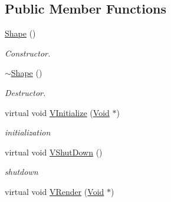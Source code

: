 \subsection*{Public Member Functions}
\begin{DoxyCompactItemize}
\item 
\hypertarget{classContent_1_1Shape_1_1Renderer_1_1Shape_a12e9b7f1287c655fbe5b909c3b0bb60c}{
\hyperlink{classContent_1_1Shape_1_1Renderer_1_1Shape_a12e9b7f1287c655fbe5b909c3b0bb60c}{Shape} ()}
\label{classContent_1_1Shape_1_1Renderer_1_1Shape_a12e9b7f1287c655fbe5b909c3b0bb60c}

\begin{DoxyCompactList}\small\item\em Constructor. \item\end{DoxyCompactList}\item 
\hypertarget{classContent_1_1Shape_1_1Renderer_1_1Shape_abb84c4d7b779c13898c680c7394a36d0}{
\hyperlink{classContent_1_1Shape_1_1Renderer_1_1Shape_abb84c4d7b779c13898c680c7394a36d0}{$\sim$Shape} ()}
\label{classContent_1_1Shape_1_1Renderer_1_1Shape_abb84c4d7b779c13898c680c7394a36d0}

\begin{DoxyCompactList}\small\item\em Destructor. \item\end{DoxyCompactList}\item 
\hypertarget{classContent_1_1Shape_1_1Renderer_1_1Shape_a6727c73a560c575080b3158ef7e3e308}{
virtual void \hyperlink{classContent_1_1Shape_1_1Renderer_1_1Shape_a6727c73a560c575080b3158ef7e3e308}{VInitialize} (\hyperlink{structVoid}{Void} $\ast$)}
\label{classContent_1_1Shape_1_1Renderer_1_1Shape_a6727c73a560c575080b3158ef7e3e308}

\begin{DoxyCompactList}\small\item\em initialization \item\end{DoxyCompactList}\item 
\hypertarget{classContent_1_1Shape_1_1Renderer_1_1Shape_aad1b2f1181de98c2abf45e9d1437edf4}{
virtual void \hyperlink{classContent_1_1Shape_1_1Renderer_1_1Shape_aad1b2f1181de98c2abf45e9d1437edf4}{VShutDown} ()}
\label{classContent_1_1Shape_1_1Renderer_1_1Shape_aad1b2f1181de98c2abf45e9d1437edf4}

\begin{DoxyCompactList}\small\item\em shutdown \item\end{DoxyCompactList}\item 
\hypertarget{classContent_1_1Shape_1_1Renderer_1_1Shape_a834085fc42c92e3c4c4e7c74a54004f3}{
virtual void \hyperlink{classContent_1_1Shape_1_1Renderer_1_1Shape_a834085fc42c92e3c4c4e7c74a54004f3}{VRender} (\hyperlink{structVoid}{Void} $\ast$)}
\label{classContent_1_1Shape_1_1Renderer_1_1Shape_a834085fc42c92e3c4c4e7c74a54004f3}


\end{DoxyCompactItemize}
